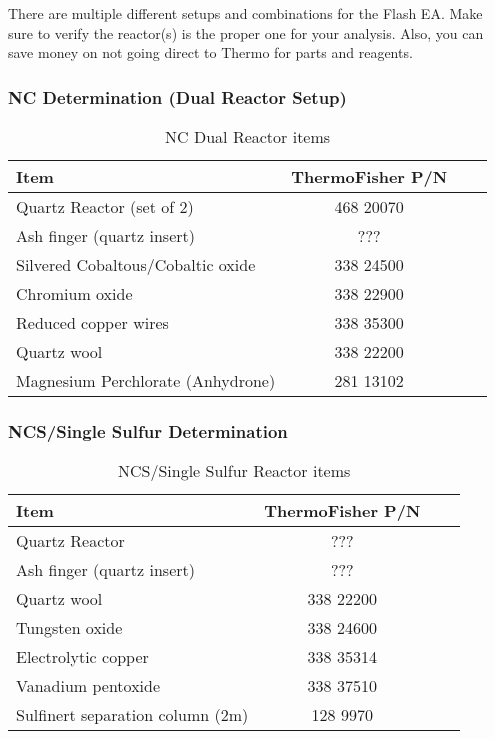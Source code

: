 \documentclass[12pt]{../SOP3}\usepackage[]{graphicx}\usepackage[]{color}
\begin{document}
\NP There are multiple different setups and combinations for the Flash EA. Make sure to verify the reactor(s) is the proper one for your analysis. Also, you can save money on not going direct to Thermo for parts and reagents.

\subsubsection{NC Determination (Dual Reactor Setup)}

\begin{table}[h]
\label{NC Dual Reactor item list}
\caption{NC Dual Reactor items}
\centering
\begin{tabular}{lccc} \hline
Item    & ThermoFisher P/N \\ \hline\hline
Quartz Reactor (set of 2)   & 468 20070 \\ 
Ash finger (quartz insert)    & ??? \\ 
Silvered Cobaltous/Cobaltic oxide   & 338 24500 \\ 
Chromium oxide    & 338 22900 \\ 
Reduced copper wires    & 338 35300 \\ 
Quartz wool   & 338 22200 \\ 
Magnesium Perchlorate (Anhydrone)   & 281 13102 \\ 
\end{tabular}
\end{table}

\subsubsection{NCS/Single Sulfur Determination}

\begin{table}[h]
\label{NCS/Single Sulfur Reactor item list}
\caption{NCS/Single Sulfur Reactor items}
\centering
\begin{tabular}{lccc} \hline
Item    & ThermoFisher P/N \\ \hline\hline
Quartz Reactor   & ??? \\ 
Ash finger (quartz insert)    & ??? \\ 
Quartz wool   & 338 22200 \\ 
Tungsten oxide    & 338 24600 \\ 
Electrolytic copper   & 338 35314 \\ 
Vanadium pentoxide   & 338 37510 \\ 
Sulfinert separation column (2m)   & 128 9970 \\ 
\end{tabular}
\end{table}
\end{document}
